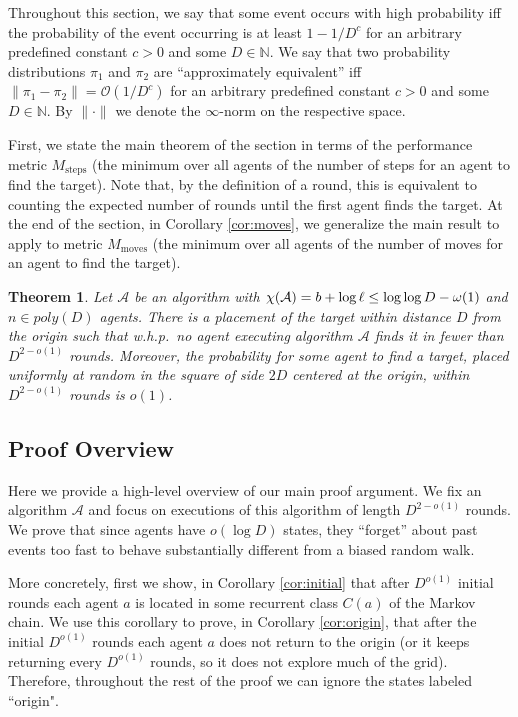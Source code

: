 \documentclass[11pt]{article}
\newtheorem{theorem}{Theorem}[section]
\newcommand{\N}{\mathbb{N}}
\newcommand{\BO}{\mathcal{O}}
\begin{document}
Throughout this section, we say that some event occurs with high probability iff the probability of the event occurring is at least $1 - 1/D^c$ for an arbitrary predefined constant $c > 0$ and some $D \in \N$. We say that two probability distributions $\pi_1$ and $\pi_2$ are ``approximately equivalent'' iff $\|\pi_1 - \pi_2\| = \BO(1/D^c)$ for an arbitrary predefined constant $c > 0$ and some $D \in \N$. By $\|\cdot\|$ we denote the $\infty$-norm on the respective space.

First, we state the main theorem of the section in terms of the performance metric $M_{\text{steps}}$ (the minimum over all agents of the number of steps for an agent to find the target). Note that, by the definition of a round, this is equivalent to counting the expected number of rounds until the first agent finds the target. At the end of the section, in Corollary \ref{cor:moves}, we generalize the main result to apply to metric $M_{\text{moves}}$ (the minimum over all agents of the number of moves for an agent to find the target). 

\begin{theorem}\label{thm:lower}
	Let $\mathcal{A}$ be an algorithm with $\chi({\cal A}) = b + \log \ell \leq \log \log D-\omega(1)$ and $n \in poly(D)$ agents. There is a placement of the target within distance $D$ from the origin such that w.h.p.\ no agent executing algorithm $\mathcal{A}$ finds it in fewer than $D^{2-o(1)}$ rounds.
	Moreover, the probability for some agent to find a target, placed uniformly at random in the square of side $2D$ centered at the origin, within $D^{2-o(1)}$ rounds is $o(1)$.
\end{theorem}

\subsection{Proof Overview}

Here we provide a high-level overview of our main proof argument. We fix an algorithm $\mathcal{A}$ and focus on executions of this algorithm of length $D^{2-o(1)}$ rounds. We prove that since agents have $o(\log D)$ states, they ``forget'' about past events too fast to behave substantially different from a biased random walk. 


More concretely, first we show, in Corollary \ref{cor:initial} that after $D^{o(1)}$ initial rounds each agent $a$ is located in some recurrent class $C(a)$ of the Markov chain. We use this corollary to prove, in Corollary \ref{cor:origin}, that after the initial $D^{o(1)}$ rounds each agent $a$ does not return to the origin (or it keeps returning every $D^{o(1)}$ rounds, so it does not explore much of the grid). Therefore, throughout the rest of the proof we can ignore the states labeled ``origin".  
\end{document}
